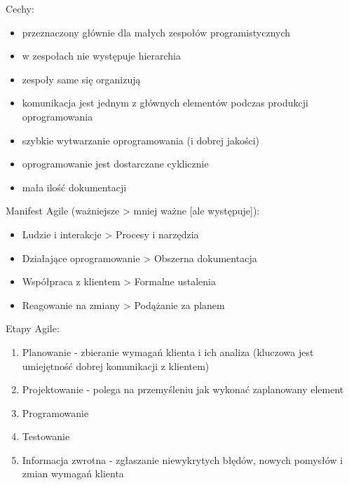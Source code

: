 \documentclass[a4paper,12pt,oneside]{book}
\begin{document}
				Cechy:
				\begin{itemize}
					\item przeznaczony głównie dla małych zespołów programistycznych
					\item w zespołach nie występuje hierarchia
					\item zespoły same się organizują
					\item komunikacja jest jednym z głównych elementów podczas produkcji oprogramowania
					\item szybkie wytwarzanie oprogramowania (i dobrej jakości)
					\item oprogramowanie jest dostarczane cyklicznie
					\item mała ilość dokumentacji
				\end{itemize}
			
				Manifest Agile (ważniejsze > mniej ważne [ale występuje]):
				\begin{itemize}
					\item Ludzie i interakcje > Procesy i narzędzia
					\item Działające oprogramowanie > Obszerna dokumentacja
					\item Współpraca z klientem > Formalne ustalenia
					\item Reagowanie na zmiany > Podążanie za planem
				\end{itemize}
		
				Etapy Agile:
				\begin{enumerate}
					\item Planowanie - zbieranie wymagań klienta i ich analiza (kluczowa jest umiejętność
					dobrej komunikacji z klientem)
					\item Projektowanie - polega na przemyśleniu jak wykonać zaplanowany element
					\item Programowanie
					\item Testowanie
					\item Informacja zwrotna - zgłaszanie niewykrytych błędów, nowych pomysłów i zmian
					wymagań klienta
				\end{enumerate}
			
\end{document}
